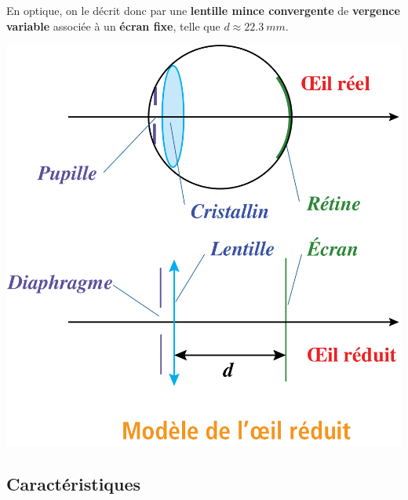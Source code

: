 \documentclass[../../main/main.tex]{subfiles}
\begin{document}
\begin{tcbraster}[raster columns=2, raster equal height=rows]
\begin{tcb}[label=def:oeil]
		En optique, on le décrit donc par une \textbf{lentille mince convergente} de
		\textbf{vergence variable} associée à un \textbf{écran fixe}, telle que $d
			\approx \SI{22.3}{mm}$.
		\tcblower
		\begin{center}
			\includegraphics[width=\linewidth]{oeil_modele}
			\label{fig:oeil_modele}
		\end{center}
	\end{tcb}
\end{tcbraster}

\subsection{Caractéristiques}
\end{document}
